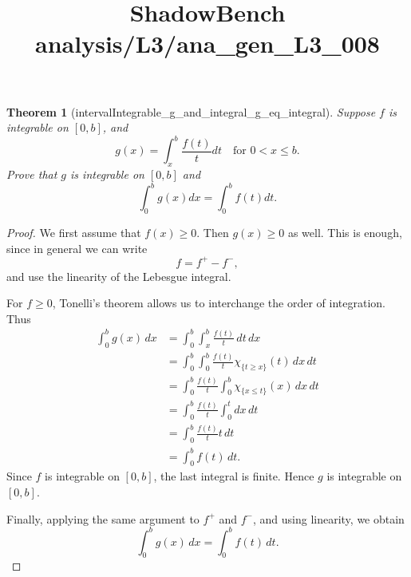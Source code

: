\documentclass{article}
\title{ShadowBench analysis/L3/ana\_gen\_L3\_008}
\newtheorem{theorem}{Theorem}
\begin{document}
\maketitle

\begin{theorem}[intervalIntegrable_g_and_integral_g_eq_integral]
Suppose $f$ is integrable on $[0, b]$, and
\[
g(x) = \int_x^b \frac{f(t)}{t} dt \quad \text{for } 0 < x \le b.
\]
Prove that $g$ is integrable on $[0, b]$ and
\[
\int_0^b g(x) dx = \int_0^b f(t) dt.
\]
\end{theorem}

\begin{proof}
We first assume that \(f(x) \geq 0\). Then \(g(x) \geq 0\) as well.
This is enough, since in general we can write
\[
f=f^{+}-f^{-},
\]
and use the linearity of the Lebesgue integral.

For \(f \geq 0\), Tonelli's theorem allows us to interchange the order of
integration. Thus
\[
\begin{aligned}
\int_{0}^{b} g(x)\,dx
&= \int_{0}^{b} \int_{x}^{b} \frac{f(t)}{t}\,dt\,dx \\
&= \int_{0}^{b} \int_{0}^{b}
\frac{f(t)}{t}\chi_{\{t\geq x\}}(t)\,dx\,dt \\
&= \int_{0}^{b} \frac{f(t)}{t}
\int_{0}^{b}\chi_{\{x\leq t\}}(x)\,dx\,dt \\
&= \int_{0}^{b} \frac{f(t)}{t}
\int_{0}^{t} dx\,dt \\
&= \int_{0}^{b} \frac{f(t)}{t}t\,dt \\
&= \int_{0}^{b} f(t)\,dt.
\end{aligned}
\]
Since \(f\) is integrable on \([0,b]\), the last integral is finite. Hence
\(g\) is integrable on \([0,b]\).

Finally, applying the same argument to \(f^{+}\) and \(f^{-}\), and using
linearity, we obtain
\[
\int_{0}^{b} g(x)\,dx=\int_{0}^{b} f(t)\,dt.
\]
\end{proof}
\end{document}
